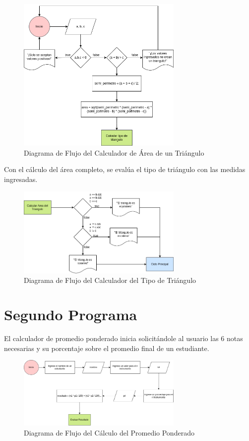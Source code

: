 \documentclass{article}
\begin{document}
\begin{figure}[H]
    \centering
    \includegraphics[width=8cm]{triangulo_area}
    \caption{Diagrama de Flujo del Calculador de Área de un Triángulo}
\end{figure}

Con el cálculo del área completo, se evalúa el tipo de triángulo con las medidas ingresadas.

\begin{figure}[H]
    \centering
    \includegraphics[width=8cm]{triangulo_tipo}
    \caption{Diagrama de Flujo del Calculador del Tipo de Triángulo}
\end{figure}

\section{Segundo Programa}

El calculador de promedio ponderado inicia solicitándole al usuario las 6 notas necesarias y su porcentaje sobre el promedio final de un estudiante.

\begin{figure}[H]
    \centering
    \includegraphics[width=8cm]{promedio_ponderado_calcular_resultado}
    \caption{Diagrama de Flujo del Cálculo del Promedio Ponderado}
\end{figure}
\end{document}
